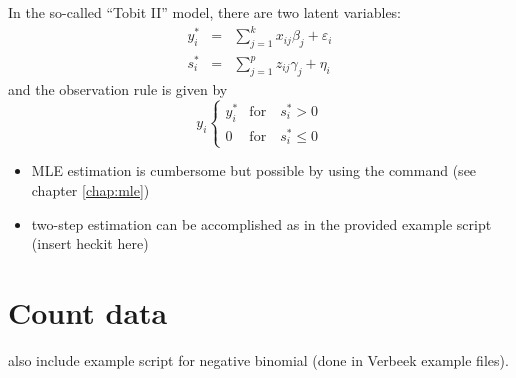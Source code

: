 In the so-called ``Tobit II'' model, there are two latent variables:
\begin{eqnarray*}
  y^*_i & = & \sum_{j=1}^k x_{ij} \beta_j + \varepsilon_i \\
  s^*_i & = & \sum_{j=1}^p z_{ij} \gamma_j + \eta_i 
\end{eqnarray*}
and the observation rule is given by
\begin{equation}
  \label{eq:tobitII}
  y_i \left\{ 
    \begin{array}{ll} 
      y^*_i & \mathrm{for} \quad s^*_i > 0 \\ 
      0 & \mathrm{for} \quad s^*_i \le 0 
    \end{array}
    \right. 
\end{equation}

\begin{itemize}
\item MLE estimation is cumbersome but possible by using the 
  command (see chapter \ref{chap:mle})
\item two-step estimation can be accomplished as in the provided
  example script (insert heckit here)
\end{itemize}
\section{Count data}
\label{sec:poisson}

also include example script for negative binomial (done in Verbeek
example files).



